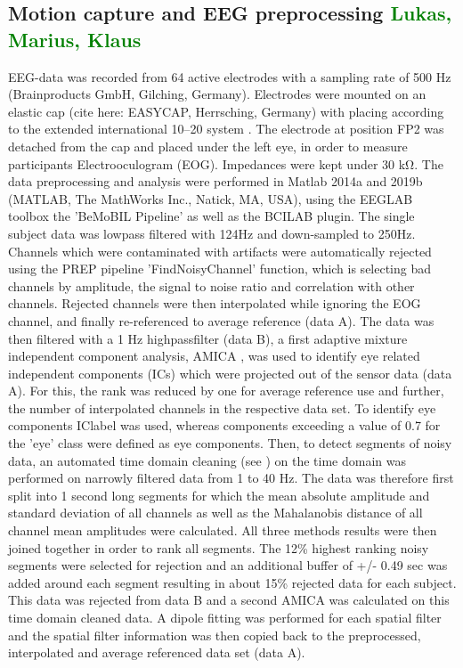 \subsection{Motion capture and EEG preprocessing \textcolor{green}{Lukas, Marius, Klaus}}

EEG-data was recorded from 64 active electrodes with a sampling rate of 500 Hz (Brainproducts GmbH, Gilching, Germany). Electrodes were mounted on an elastic cap (cite here: EASYCAP, Herrsching, Germany) with placing according to the extended international 10–20 system \cite{chatrian_ten_1985}. The electrode at position FP2 was detached from the cap and placed under the left eye, in order to measure participants Electrooculogram (EOG). Impedances were kept under 30 \si{\kohm}. The data preprocessing and analysis were performed in Matlab 2014a and 2019b  (MATLAB, The MathWorks Inc., Natick, MA, USA), using the EEGLAB toolbox \cite{delorme_eeglab:_2004} the 'BeMoBIL Pipeline' \cite{klug2018bemobil} as well as the BCILAB \cite{} plugin. The single subject data was lowpass filtered with 124Hz and down-sampled to 250Hz. Channels which were contaminated with artifacts were automatically rejected using the PREP pipeline \cite{bigdely-shamlo_prep_2015} 'FindNoisyChannel' function, which is selecting bad channels by amplitude, the signal to noise ratio and correlation with other channels. Rejected channels were then interpolated while ignoring the EOG channel, and finally re-referenced to average reference (data A). The data was then filtered with a 1 Hz highpassfilter (data B), a first adaptive mixture independent component analysis, AMICA \cite{palmer_newton_2008}, was used to identify eye related independent components (ICs) which were projected out of the sensor data (data A). For this, the rank was reduced by one for average reference use and further, the number of interpolated channels in the respective data set. To identify eye components IClabel  \cite{pion2019iclabel} was used, whereas components exceeding a value of 0.7 for the 'eye' class were defined as eye components.
Then, to detect segments of noisy data, an automated time domain cleaning (see \citet{gramann2018heading}) on the time domain was performed on narrowly filtered data from 1 to 40 Hz. The data was therefore first split into 1 second long segments for which the mean absolute amplitude and standard deviation of all channels as well as the Mahalanobis distance of all channel mean amplitudes were calculated. All three methods results were then joined together in order to rank all segments. The 12\% highest ranking noisy segments were selected for rejection and an additional buffer of +/- 0.49 sec was added around each segment resulting in about 15\% rejected data for each subject. This data was rejected from data B and a second AMICA was calculated on this time domain cleaned data. A dipole fitting \cite{oostenveld2002validating} was performed for each spatial filter and the spatial filter information was then copied back to the preprocessed, interpolated and average referenced data set (data A).

